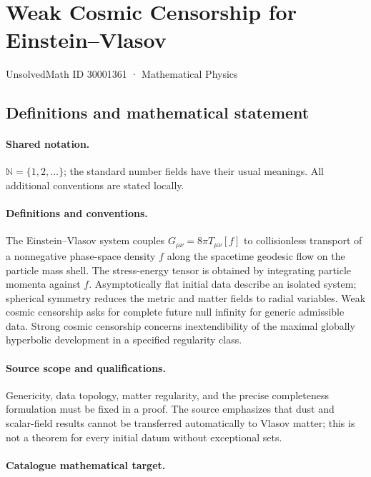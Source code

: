 \documentclass[11pt]{article}
\begin{document}
\setcounter{section}{30001360}
\section{Weak Cosmic Censorship for Einstein–Vlasov}\label{30001361}
{\small UnsolvedMath ID 30001361 · Mathematical Physics}
\subsection{Definitions and mathematical statement}

\paragraph{Shared notation.}$\mathbb N=\{1,2,\ldots\}$; the standard number fields have their usual meanings. All additional conventions are stated locally.


\paragraph{Definitions and conventions.} The Einstein--Vlasov system couples $G_{\mu\nu}=8\pi T_{\mu\nu}[f]$ to collisionless transport of a nonnegative phase-space density $f$ along the spacetime geodesic flow on the particle mass shell. The stress-energy tensor is obtained by integrating particle momenta against $f$. Asymptotically flat initial data describe an isolated system; spherical symmetry reduces the metric and matter fields to radial variables. Weak cosmic censorship asks for complete future null infinity for generic admissible data. Strong cosmic censorship concerns inextendibility of the maximal globally hyperbolic development in a specified regularity class.

\paragraph{Source scope and qualifications.} Genericity, data topology, matter regularity, and the precise completeness formulation must be fixed in a proof. The source emphasizes that dust and scalar-field results cannot be transferred automatically to Vlasov matter; this is not a theorem for every initial datum without exceptional sets.

\paragraph{Catalogue mathematical target.}
\end{document}
